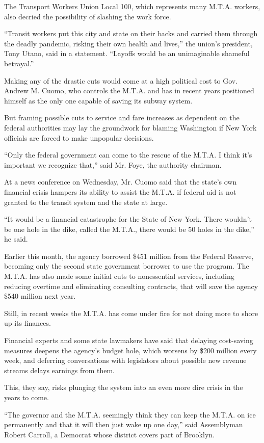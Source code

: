 The Transport Workers Union Local 100, which represents many M.T.A.
workers, also decried the possibility of slashing the work force.

``Transit workers put this city and state on their backs and carried
them through the deadly pandemic, risking their own health and lives,''
the union's president, Tony Utano, said in a statement. ``Layoffs would
be an unimaginable shameful betrayal.''

Making any of the drastic cuts would come at a high political cost to
Gov. Andrew M. Cuomo, who controls the M.T.A. and has in recent years
positioned himself as the only one capable of saving its subway system.

But framing possible cuts to service and fare increases as dependent on
the federal authorities may lay the groundwork for blaming Washington if
New York officials are forced to make unpopular decisions.

``Only the federal government can come to the rescue of the M.T.A. I
think it's important we recognize that,'' said Mr. Foye, the authority
chairman.

At a news conference on Wednesday, Mr. Cuomo said that the state's own
financial crisis hampers its ability to assist the M.T.A. if federal aid
is not granted to the transit system and the state at large.

``It would be a financial catastrophe for the State of New York. There
wouldn't be one hole in the dike, called the M.T.A., there would be 50
holes in the dike,'' he said.

Earlier this month, the agency borrowed \$451 million from the Federal
Reserve, becoming only the second state government borrower to use the
program. The M.T.A. has also made some initial cuts to nonessential
services, including reducing overtime and eliminating consulting
contracts, that will save the agency \$540 million next year.

Still, in recent weeks the M.T.A. has come under fire for not doing more
to shore up its finances.

Financial experts and some state lawmakers have said that delaying
cost-saving measures deepens the agency's budget hole, which worsens by
\$200 million every week, and deferring conversations with legislators
about possible new revenue streams delays earnings from them.

This, they say, risks plunging the system into an even more dire crisis
in the years to come.

``The governor and the M.T.A. seemingly think they can keep the M.T.A.
on ice permanently and that it will then just wake up one day,'' said
Assemblyman Robert Carroll, a Democrat whose district covers part of
Brooklyn.

